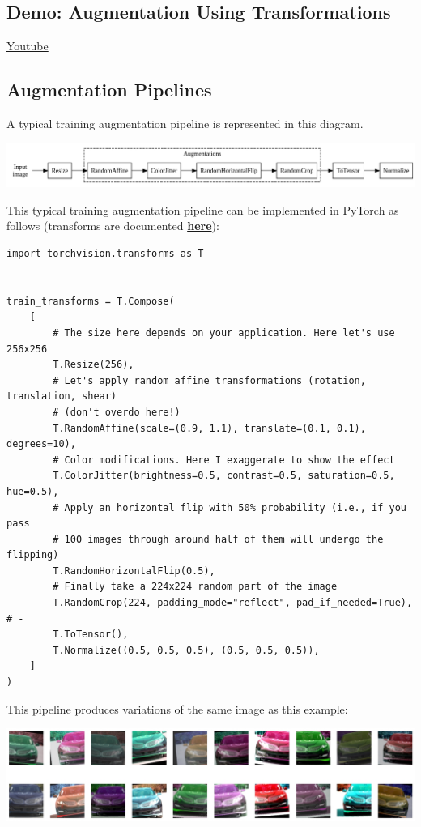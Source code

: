 \subsection{Demo: Augmentation Using Transformations}
\href{https://www.youtube.com/watch?v=HxhC6rs72cs&ab_channel=Udacity}{Youtube} \newline

\subsection{Augmentation Pipelines}

A typical training augmentation pipeline is represented in this diagram.

\includegraphics[width=1\linewidth]{img//cnn//depth/train-aug1.jpeg}

This typical training augmentation pipeline can be implemented in PyTorch as follows (transforms are documented \href{https://pytorch.org/vision/main/transforms.html}{\textbf{here}}):

\begin{lstlisting}
import torchvision.transforms as T


train_transforms = T.Compose(
    [
        # The size here depends on your application. Here let's use 256x256
        T.Resize(256),
        # Let's apply random affine transformations (rotation, translation, shear)
        # (don't overdo here!)
        T.RandomAffine(scale=(0.9, 1.1), translate=(0.1, 0.1), degrees=10),
        # Color modifications. Here I exaggerate to show the effect 
        T.ColorJitter(brightness=0.5, contrast=0.5, saturation=0.5, hue=0.5),
        # Apply an horizontal flip with 50% probability (i.e., if you pass
        # 100 images through around half of them will undergo the flipping)
        T.RandomHorizontalFlip(0.5),
        # Finally take a 224x224 random part of the image
        T.RandomCrop(224, padding_mode="reflect", pad_if_needed=True),  # -
        T.ToTensor(),
        T.Normalize((0.5, 0.5, 0.5), (0.5, 0.5, 0.5)),
    ]
)
\end{lstlisting}

This pipeline produces variations of the same image as this example:

\includegraphics[width=1\linewidth]{img//cnn//depth/augmentations.jpeg}

